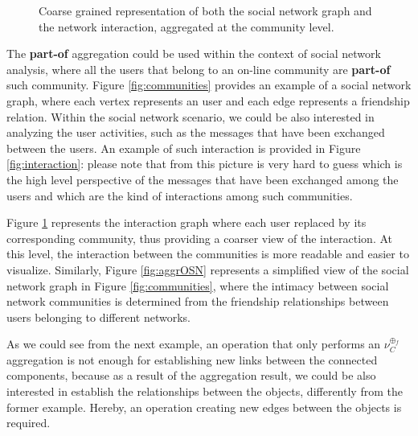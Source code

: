 \begin{figure}[!tp]
\begin{minipage}[!h]{0.7\textwidth}
		\label{fig:aggrMSG}
	\end{minipage}
\caption{Coarse grained representation of both the social network graph and the network interaction, aggregated at the community level.}
\end{figure}

\begin{example}\label{ex:8}
The \textbf{part-of} aggregation could be used within the context of social network analysis, where all the users that belong to an on-line community are \textbf{part-of} such community. Figure \vref{fig:communities} provides an example of a social network graph, where each vertex represents an user and each edge represents a friendship relation. Within the social network scenario, we could be also interested in analyzing the user activities, such as the messages that have been exchanged between the users. An example of such interaction is provided in Figure \ref{fig:interaction}: please note that from this picture is very hard to guess which is the high level perspective of the messages that have been exchanged among the users and which are the kind of interactions among such communities.

Figure \ref{fig:aggrMSG} represents the interaction graph where each user replaced by its corresponding community, thus providing a coarser view of the interaction. At this level, the interaction between the communities is more readable and easier to visualize. Similarly, Figure \ref{fig:aggrOSN} represents a simplified view of the social network graph in Figure \ref{fig:communities}, where the intimacy between social network communities is determined from the friendship relationships between users belonging to different networks.
\end{example}

As we could see from the next example, an operation that only performs an $\nu_C^{\oplus_f}$ aggregation is not enough for establishing new links between the connected components, because as a result of the aggregation result, we could be also interested in establish the relationships between the objects, differently from the former example. Hereby, an operation creating new edges between the objects is required.


